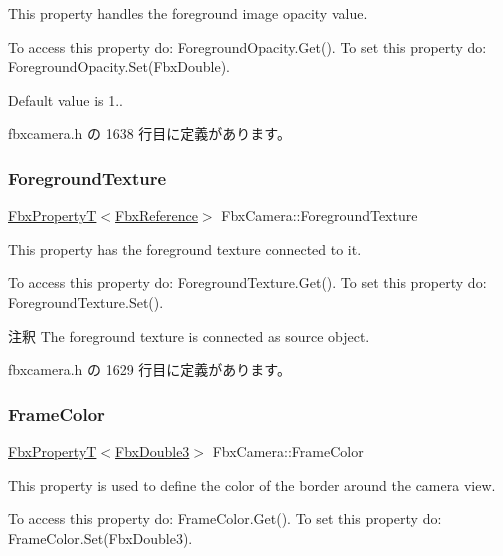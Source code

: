 This property handles the foreground image opacity value.

To access this property do\+: Foreground\+Opacity.\+Get(). To set this property do\+: Foreground\+Opacity.\+Set(\+Fbx\+Double).

Default value is 1.. 

 fbxcamera.\+h の 1638 行目に定義があります。

\mbox{\label{class_fbx_camera_aeb121a9199a538fa7825bc26d326b7f9}} 
\subsubsection{\texorpdfstring{Foreground\+Texture}{ForegroundTexture}}
{\footnotesize\ttfamily \hyperlink{class_fbx_property_t}{Fbx\+PropertyT}$<$\hyperlink{fbxtypes_8h_a44df6a2eec915cf27cd481e5c5e48a24}{Fbx\+Reference}$>$ Fbx\+Camera\+::\+Foreground\+Texture}

This property has the foreground texture connected to it.

To access this property do\+: Foreground\+Texture.\+Get(). To set this property do\+: Foreground\+Texture.\+Set().

\begin{DoxyRemark}{注釈}
The foreground texture is connected as source object. 
\end{DoxyRemark}


 fbxcamera.\+h の 1629 行目に定義があります。

\mbox{\label{class_fbx_camera_ae032c4d73824601774f06ce4375943cd}} 
\subsubsection{\texorpdfstring{Frame\+Color}{FrameColor}}
{\footnotesize\ttfamily \hyperlink{class_fbx_property_t}{Fbx\+PropertyT}$<$\hyperlink{fbxtypes_8h_ae0a96f14cde566774c7553aa7523b7a7}{Fbx\+Double3}$>$ Fbx\+Camera\+::\+Frame\+Color}

This property is used to define the color of the border around the camera view.

To access this property do\+: Frame\+Color.\+Get(). To set this property do\+: Frame\+Color.\+Set(\+Fbx\+Double3).

